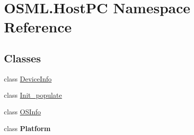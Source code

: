 \hypertarget{namespaceOSML_1_1HostPC}{}\section{O\+S\+M\+L.\+Host\+PC Namespace Reference}
\label{namespaceOSML_1_1HostPC}
\subsection*{Classes}
\begin{DoxyCompactItemize}
\item 
class \mbox{\hyperlink{classOSML_1_1HostPC_1_1DeviceInfo}{Device\+Info}}
\item 
class \mbox{\hyperlink{classOSML_1_1HostPC_1_1Init__populate}{Init\+\_\+populate}}
\item 
class \mbox{\hyperlink{classOSML_1_1HostPC_1_1OSInfo}{O\+S\+Info}}
\item 
class {\bfseries Platform}
\end{DoxyCompactItemize}
